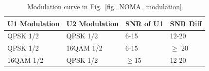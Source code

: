 \begin{table}[t]
\caption{Modulation curve in Fig.~\ref{fig_NOMA_modulation}}
    \begin{tabular}{| l | l | l | l |}
    \hline
    U1 Modulation & U2 Modulation & SNR of U1 & SNR Diff \\ \hline
    QPSK 1/2       & QPSK 1/2       & 6-15           & 12-20                  \\ \hline
    QPSK 1/2       & 16QAM 1/2     & 6-15           &  $\geq$ 20                     \\ \hline
    16QAM 1/2     & QPSK 1/2       & $\geq$15            & 12-20                   \\ \hline
    \end{tabular}
\label{tb_NOMA_modulation}
\end{table}